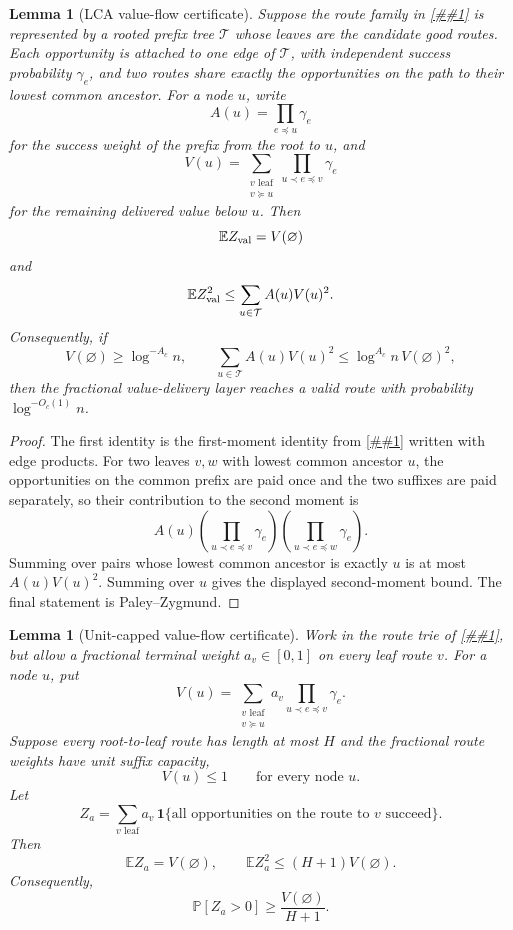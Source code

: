 \documentclass[10pt]{article}
\newcommand{\cref}[1]{\ref{##1}}
\newtheorem{lemma}[theorem]{Lemma}
\theoremstyle{definition}
\newcommand{\E}{\mathbb{E}}
\newcommand{\Prb}{\mathbb{P}}
\begin{document}
\begin{lemma}[LCA value-flow certificate]\label{lem:lca-value-flow}
   Suppose the route family in \cref{cor:fractional-value-delivery} is
   represented by a rooted prefix tree $\mathcal T$ whose leaves are the
   candidate good routes. Each opportunity is attached to one edge of
   $\mathcal T$, with independent success probability $\gamma_e$, and two
   routes share exactly the opportunities on the path to their lowest common
   ancestor. For a node $u$, write
   \[
      A(u)=\prod_{e\preceq u}\gamma_e
   \]
   for the success weight of the prefix from the root to $u$, and
   \[
      V(u)=
      \sum_{\substack{v\text{ leaf}\\ v\succeq u}}
      \prod_{u\prec e\preceq v}\gamma_e
   \]
   for the remaining delivered value below $u$. Then
   \[
      \E Z_{\rm val}=V(\varnothing)
   \]
   and
   \[
      \E Z_{\rm val}^2
      \le
      \sum_{u\in\mathcal T} A(u)V(u)^2 .
   \]
   Consequently, if
   \[
      V(\varnothing)\ge \log^{-A_c}n,
      \qquad
      \sum_{u\in\mathcal T}A(u)V(u)^2
      \le
      \log^{A_c}n\,V(\varnothing)^2,
   \]
   then the fractional value-delivery layer reaches a valid route with
   probability $\log^{-O_c(1)}n$.
\end{lemma}

\begin{proof}
   The first identity is the first-moment identity from
   \cref{cor:fractional-value-delivery} written with edge products. For two
   leaves $v,w$ with lowest common ancestor $u$, the opportunities on the
   common prefix are paid once and the two suffixes are paid separately, so
   their contribution to the second moment is
   \[
      A(u)
      \left(\prod_{u\prec e\preceq v}\gamma_e\right)
      \left(\prod_{u\prec e\preceq w}\gamma_e\right).
   \]
   Summing over pairs whose lowest common ancestor is exactly $u$ is at most
   $A(u)V(u)^2$. Summing over $u$ gives the displayed second-moment bound. The
   final statement is Paley--Zygmund.
\end{proof}

\begin{lemma}[Unit-capped value-flow certificate]\label{lem:unit-capped-value-flow}
   Work in the route trie of \cref{lem:lca-value-flow}, but allow a fractional
   terminal weight $a_v\in[0,1]$ on every leaf route $v$. For a node $u$, put
   \[
      V(u)=
      \sum_{\substack{v\text{ leaf}\\ v\succeq u}}
      a_v\prod_{u\prec e\preceq v}\gamma_e .
   \]
   Suppose every root-to-leaf route has length at most $H$ and the fractional
   route weights have unit suffix capacity,
   \[
      V(u)\le1
      \qquad\text{for every node }u.
   \]
   Let
   \[
      Z_a=\sum_{v\text{ leaf}}a_v\,
      \mathbf 1\{\text{all opportunities on the route to }v\text{ succeed}\}.
   \]
   Then
   \[
      \E Z_a=V(\varnothing),
      \qquad
      \E Z_a^2\le (H+1)V(\varnothing).
   \]
   Consequently,
   \[
      \Prb[Z_a>0]\ge \frac{V(\varnothing)}{H+1}.
   \]
\end{lemma}
\end{document}
